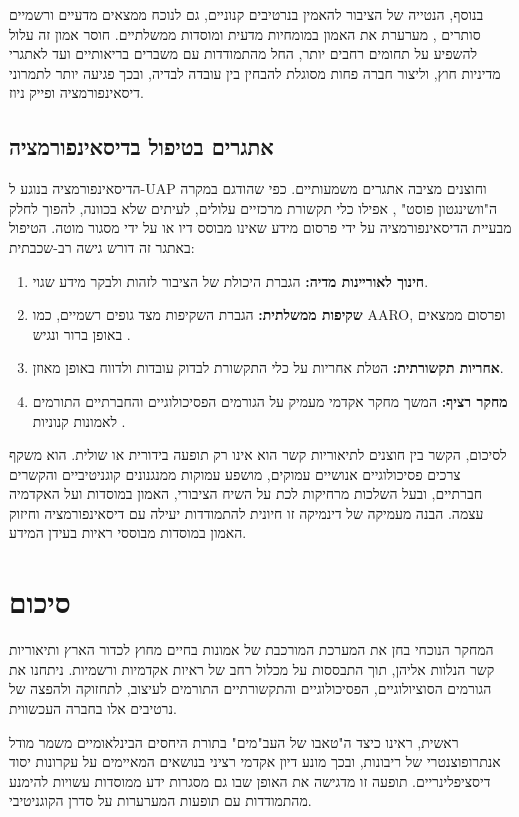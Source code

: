 \documentclass[12pt,a4paper]{article}
\begin{document}
בנוסף, הנטייה של הציבור להאמין בנרטיבים קנוניים, גם לנוכח ממצאים מדעיים ורשמיים סותרים \cite{AARO2024report}, מערערת את האמון במומחיות מדעית ומוסדות ממשלתיים. חוסר אמון זה עלול להשפיע על תחומים רחבים יותר, החל מהתמודדות עם משברים בריאותיים ועד לאתגרי מדיניות חוץ, וליצור חברה פחות מסוגלת להבחין בין עובדה לבדיה, ובכך פגיעה יותר לתמרוני דיסאינפורמציה ופייק ניוז.

\subsection{אתגרים בטיפול בדיסאינפורמציה}
הדיסאינפורמציה בנוגע ל-UAP וחוצנים מציבה אתגרים משמעותיים. כפי שהודגם במקרה ה"וושינגטון פוסט" \cite{AntonVugrin2022}, אפילו כלי תקשורת מרכזיים עלולים, לעיתים שלא בכוונה, להפוך לחלק מבעיית הדיסאינפורמציה על ידי פרסום מידע שאינו מבוסס דיו או על ידי מסגור מוטה. הטיפול באתגר זה דורש גישה רב-שכבתית:
\begin{enumerate}
    \item \textbf{חינוך לאוריינות מדיה:} הגברת היכולת של הציבור לזהות ולבקר מידע שגוי.
    \item \textbf{שקיפות ממשלתית:} הגברת השקיפות מצד גופים רשמיים, כמו AARO, ופרסום ממצאים באופן ברור ונגיש \cite{AARO2024report}.
    \item \textbf{אחריות תקשורתית:} הטלת אחריות על כלי התקשורת לבדוק עובדות ולדווח באופן מאוזן.
    \item \textbf{מחקר רציף:} המשך מחקר אקדמי מעמיק על הגורמים הפסיכולוגיים והחברתיים התורמים לאמונות קנוניות \cite{Swami2009, Douglas2015, Wojcik2021Kahneman2011, UnknownAbduction}.
\end{enumerate}
לסיכום, הקשר בין חוצנים לתיאוריות קשר הוא אינו רק תופעה בידורית או שולית. הוא משקף צרכים פסיכולוגיים אנושיים עמוקים, מושפע עמוקות ממנגנונים קוגניטיביים והקשרים חברתיים, ובעל השלכות מרחיקות לכת על השיח הציבורי, האמון במוסדות ועל האקדמיה עצמה. הבנה מעמיקה של דינמיקה זו חיונית להתמודדות יעילה עם דיסאינפורמציה וחיזוק האמון במוסדות מבוססי ראיות בעידן המידע.

\section{סיכום}

המחקר הנוכחי בחן את המערכת המורכבת של אמונות בחיים מחוץ לכדור הארץ ותיאוריות קשר הנלוות אליהן, תוך התבססות על מכלול רחב של ראיות אקדמיות ורשמיות. ניתחנו את הגורמים הסוציולוגיים, הפסיכולוגיים והתקשורתיים התורמים לעיצוב, לתחזוקה ולהפצה של נרטיבים אלו בחברה העכשווית.

ראשית, ראינו כיצד ה"טאבו של העב"מים" בתורת היחסים הבינלאומיים \cite{Wendt2008} משמר מודל אנתרופוצנטרי של ריבונות, ובכך מונע דיון אקדמי רציני בנושאים המאיימים על עקרונות יסוד דיסציפלינריים. תופעה זו מדגישה את האופן שבו גם מסגרות ידע ממוסדות עשויות להימנע מהתמודדות עם תופעות המערערות על סדרן הקוגניטיבי.
\end{document}
